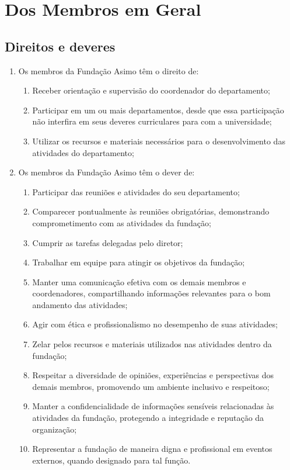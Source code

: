 \chapter{Dos Membros em Geral}  
    \section{Direitos e deveres}
    \begin{enumerate}
        \item Os membros da Fundação Asimo têm o direito de:
        \begin{enumerate}
            \item Receber orientação e supervisão do coordenador do departamento;
            \item Participar em um ou mais departamentos, desde que essa participação não interfira em seus deveres curriculares para com a universidade;
            \item Utilizar os recursos e materiais necessários para o desenvolvimento das atividades do departamento;
        \end{enumerate}
        \item Os membros da Fundação Asimo têm o dever de:
        \begin{enumerate}
            \item Participar das reuniões e atividades do seu departamento;
            \item Comparecer pontualmente às reuniões obrigatórias, demonstrando comprometimento com as atividades da fundação;
            \item Cumprir as tarefas delegadas pelo diretor;
            \item Trabalhar em equipe para atingir os objetivos da fundação;
            \item Manter uma comunicação efetiva com os demais membros e coordenadores, compartilhando informações relevantes para o bom andamento das atividades;
            \item Agir com ética e profissionalismo no desempenho de suas atividades;
            \item Zelar pelos recursos e materiais utilizados nas atividades dentro da fundação;
            \item Respeitar a diversidade de opiniões, experiências e perspectivas dos demais membros, promovendo um ambiente inclusivo e respeitoso;
            \item Manter a confidencialidade de informações sensíveis relacionadas às atividades da fundação, protegendo a integridade e reputação da organização;
            \item Representar a fundação de maneira digna e profissional em eventos externos, quando designado para tal função.
        \end{enumerate}
    \end{enumerate}
 

